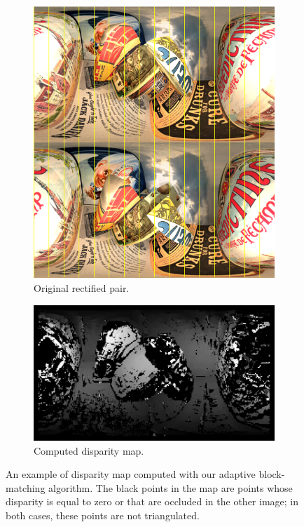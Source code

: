 \begin{figure}[h]
\centering
	\begin{subfigure}{0.6\linewidth}
		\centering
		\includegraphics[width=\linewidth]{img/rectified_pair.png}
		\caption{Original rectified pair.}
	\end{subfigure}
	\begin{subfigure}{0.6\linewidth}
		\centering
		\includegraphics[width=\linewidth]{img/lldisparity2.png}
		\caption{Computed disparity map.}
	\end{subfigure}
\caption{An example of disparity map computed with our adaptive block-matching
algorithm. The black points in the map are points whose disparity is equal to
zero or that are occluded in the other image; in both cases, these points are
not triangulated.}
\label{fig:llDisparity}
\end{figure}

